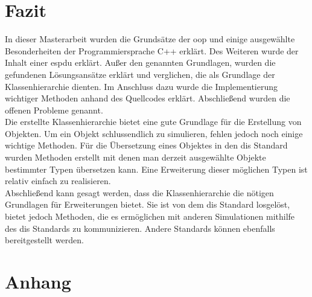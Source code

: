 \chapter{Fazit}
In dieser Masterarbeit wurden die Grundsätze der \acl{oop} und einige ausgewählte Besonderheiten der Programmiersprache C++ erklärt. Des Weiteren wurde der Inhalt einer \ac{espdu} erklärt. 
Außer den genannten Grundlagen, wurden die gefundenen Lösungsansätze erklärt und verglichen, die als Grundlage der Klassenhierarchie dienten. Im Anschluss dazu wurde die Implementierung wichtiger Methoden anhand des Quellcodes erklärt. Abschließend wurden die offenen Probleme genannt. \\
Die erstellte Klassenhierarchie bietet eine gute Grundlage für die Erstellung von Objekten. Um ein Objekt schlussendlich zu simulieren, fehlen jedoch noch einige wichtige Methoden. Für die Übersetzung eines Objektes in den \ac{dis} Standard  wurden Methoden erstellt mit denen man derzeit ausgewählte Objekte bestimmter Typen übersetzen kann. Eine Erweiterung dieser möglichen Typen ist relativ einfach zu realisieren. \\
Abschließend kann gesagt werden, dass die Klassenhierarchie die nötigen Grundlagen für Erweiterungen bietet. Sie ist von dem \ac{dis} Standard losgelöst, bietet jedoch Methoden, die es ermöglichen mit anderen Simulationen mithilfe des \ac{dis} Standards zu kommunizieren. Andere Standards können ebenfalls bereitgestellt werden. 


\chapter{Anhang}


\vspace{1cm}



 
